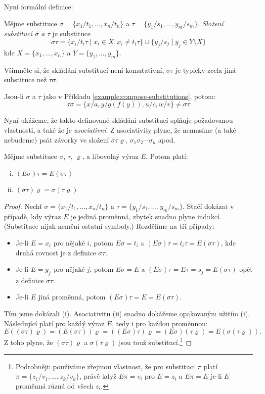 Nyní formální definice:

\begin{definition}
Mějme substituce $\sigma=\{x_1/t_1,\dots,x_n/t_n\}$ a $\tau=\{y_1/s_1,\dots,y_m/s_m\}$. \emph{Složení substitucí $\sigma$ a $\tau$} je substituce
$$
\sigma\tau=\{x_i/t_i\tau\mid x_i\in X,x_i\neq t_i\tau\}\cup\{y_j/s_j\mid y_j\in Y\setminus X\}
$$
kde $X=\{x_1,\dots,x_n\}$ a $Y=\{y_1,\dots,y_m\}$.
\end{definition}

Všimněte si, že skládání substitucí není komutativní, $\sigma\tau$ je typicky zcela jiná substituce než $\tau\sigma$.

\begin{example}
    Jsou-li $\sigma$ a $\tau$ jako v Příkladu \ref{example:compose-substitutions}, potom: 
    $$
    \tau\sigma=\{x/a,y/g(f(y)),u/c,w/v\}\neq \sigma\tau
    $$
\end{example}

Nyní ukážeme, že takto definované skládání substitucí splňuje požadovanou vlastnosti, a také že je \emph{asociativní}. Z asociativity plyne, že nemusíme (a také nebudeme) psát závorky ve složení $\sigma\tau\varrho$, $\sigma_1\sigma_2\cdots\sigma_n$ apod.

\begin{proposition}
Mějme substituce $\sigma$, $\tau$, $\varrho$, a libovolný výraz $E$. Potom platí:
\begin{enumerate}[(i)]
    \item $(E\sigma)\tau=E(\sigma\tau)$
    \item $(\sigma\tau)\varrho=\sigma(\tau\varrho)$
\end{enumerate}
\end{proposition}

\begin{proof}
Nechť $\sigma=\{x_1/t_1,\dots,x_n/t_n\}$ a $\tau=\{y_1/s_1,\dots,y_m/s_m\}$. Stačí dokázat v případě, kdy výraz $E$ je jediná proměnná, zbytek snadno plyne indukcí. (Substituce nijak nemění ostatní symboly.) Rozdělíme na tři případy:
\begin{itemize}
    \item Je-li $E=x_i$ pro nějaké $i$, potom $E\sigma=t_i$ a $(E\sigma)\tau=t_i\tau=E(\sigma\tau)$, kde druhá rovnost je z definice $\sigma\tau$.
    \item Je-li $E=y_j$ pro nějaké $j$, potom $E\sigma=E$ a $(E\sigma)\tau=E\tau=s_j=E(\sigma\tau)$ opět z definice $\sigma\tau$.
    \item Je-li $E$ jiná proměnná, potom $(E\sigma)\tau=E=E(\sigma\tau)$.
\end{itemize}
Tím jsme dokázali (i). Asociativitu (ii) snadno dokážeme opakovaným užitím (i). Následující platí pro každý výraz $E$, tedy i pro každou proměnnou:
$$
E((\sigma\tau)\varrho)=(E(\sigma\tau))\varrho=((E\sigma)\tau)\varrho=(E\sigma)(\tau\varrho)=E(\sigma(\tau\varrho)).
$$
Z toho plyne, že $(\sigma\tau)\varrho$ a $\sigma(\tau\varrho)$ jsou touž substitucí.\footnote{Podrobněji: používáme zřejmou vlastnost, že pro substituci $\pi$ platí $\pi=\{z_1/v_1,\dots,z_k/v_k\}$, právě když $E\pi=v_i$ pro $E=z_i$  a $E\pi=E$ je-li $E$ proměnná různá od všech $z_i$.}
\end{proof}    

